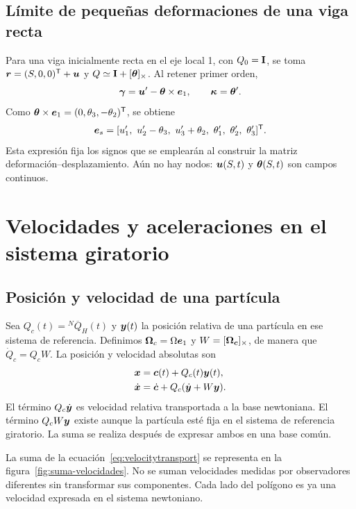 \subsection{Límite de pequeñas deformaciones de una viga recta}
Para una viga inicialmente recta en el eje local 1, con $Q_0=\mathbf I$, se toma $\bm{r}=(S,0,0)^\mathsf T+\bm{u}$ y $Q\simeq\mathbf I+[\bm{\theta}]_{\times}$. Al retener primer orden,
\begin{equation}
 \bm{\gamma}=\bm{u}'-\bm{\theta}\times\bm{e}_1,
 \qquad \bm{\kappa}=\bm{\theta}'.
\end{equation}
Como $\bm{\theta}\times\bm{e}_1=(0,\theta_3,-\theta_2)^\mathsf T$, se obtiene
\begin{equation}
 \vct e_s=
 [u_1',\ u_2'-\theta_3,\ u_3'+\theta_2,\ \theta_1',\ \theta_2',\ \theta_3']^\tr.
 \label{eq:strainlinear}
\end{equation}
Esta expresión fija los signos que se emplearán al construir la matriz deformación--desplazamiento. Aún no hay nodos: $\bm{u}(S,t)$ y $\bm{\theta}(S,t)$ son campos continuos.

\section{Velocidades y aceleraciones en el sistema giratorio}
\subsection{Posición y velocidad de una partícula}
Sea $Q_c(t)={}^N\overline Q_H(t)$ y $\bm{y}(t)$ la posición relativa de una partícula en ese sistema de referencia. Definimos $\bm{\Omega}_c=\Omega\bm{e}_1$ y $W=[\bm{\Omega_c}]_{\times}$, de manera que $\dot Q_c=Q_cW$. La posición y velocidad absolutas son
\begin{align}
 \bm{x}&=\bm{c}(t)+Q_c(t)\bm{y}(t),\\
 \dot{\bm{x}}&=\dot{\bm{c}}+Q_c(\dot{\bm{y}}+W\bm{y}).
 \label{eq:velocitytransport}
\end{align}
El término $Q_c\dot{\bm{y}}$ es velocidad relativa transportada a la base newtoniana. El término $Q_cW\bm{y}$ existe aunque la partícula esté fija en el sistema de referencia giratorio. La suma se realiza después de expresar ambos en una base común.

La suma de la ecuación~\eqref{eq:velocitytransport} se representa en la figura~\ref{fig:suma-velocidades}. No se suman velocidades medidas por observadores diferentes sin transformar sus componentes. Cada lado del polígono es ya una velocidad expresada en el sistema newtoniano.

